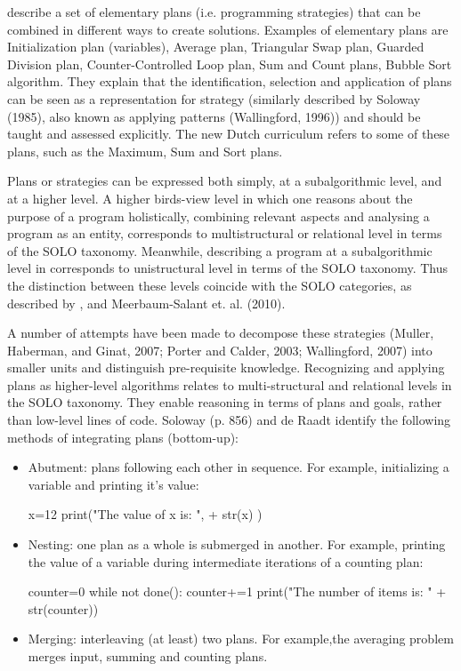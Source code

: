  describe a set of elementary plans (i.e. programming strategies) that can be combined in different ways to create solutions. Examples of elementary plans are Initialization plan (variables), Average plan, Triangular Swap plan, Guarded Division plan, Counter-Controlled Loop plan, Sum and Count plans, Bubble Sort algorithm. They explain that the identification, selection and application of plans can be seen as a representation for strategy (similarly described by Soloway (1985), also known as applying patterns (Wallingford, 1996)) and should be taught and assessed explicitly. The new Dutch curriculum \cite{Barendsen2016} refers to some of these plans, such as the Maximum, Sum and Sort plans.

Plans or strategies can be expressed both simply, at a subalgorithmic level, and at a higher level\cite{deRaadt2006}. A higher birds-view level in which one reasons about the purpose of a program holistically, combining relevant aspects and analysing a program as an entity, corresponds to multistructural or relational level in terms of the SOLO taxonomy\cite{Smetsers2017}. Meanwhile, describing a program at a subalgorithmic level in corresponds to unistructural level in terms of the SOLO taxonomy. Thus the distinction between these levels coincide with the SOLO categories, as described by ,  and Meerbaum-Salant et. al. (2010).

A number of attempts have been made to decompose these strategies (Muller, Haberman, and Ginat, 2007; Porter and Calder, 2003; Wallingford, 2007) into smaller units and distinguish pre-requisite knowledge. Recognizing and applying plans as higher-level algorithms relates to multi-structural and relational levels in the SOLO taxonomy. They enable reasoning in terms of plans and goals, rather than low-level lines of code. Soloway (p. 856) and de Raadt identify the following methods of integrating plans (bottom-up):
\begin{itemize}
\item Abutment: plans following each other in sequence. For example, initializing a variable and printing it’s value:
\begin{PYTHON}
x=12
print("The value of x is: ", + str(x) )
\end{PYTHON}


\item Nesting: one plan as a whole is submerged in another. For example, printing the value of a variable during intermediate iterations of a counting plan:
\begin{PYTHON}
counter=0
while not done():
    counter+=1
    print("The number of items is: " + str(counter))
\end{PYTHON}

\item Merging: interleaving (at least) two plans. For example,the averaging problem merges input, summing and counting plans.
\end{itemize}

